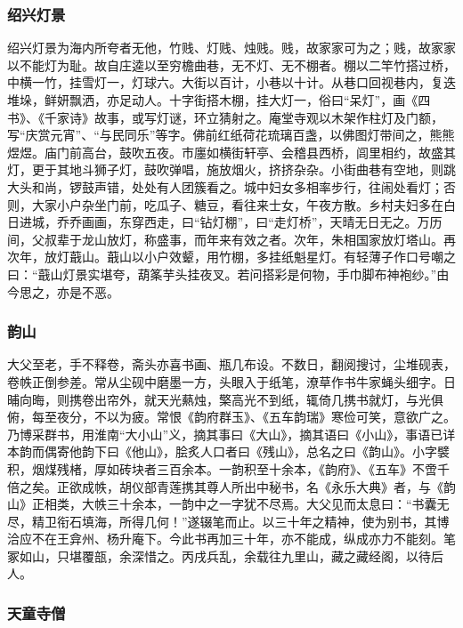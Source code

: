 \documentclass[]{article}
\begin{document}
\hypertarget{header-n449}{%
\subsubsection{绍兴灯景}\label{header-n449}}

绍兴灯景为海内所夸者无他，竹贱、灯贱、烛贱。贱，故家家可为之；贱，故家家以不能灯为耻。故自庄逵以至穷檐曲巷，无不灯、无不棚者。棚以二竿竹搭过桥，中横一竹，挂雪灯一，灯球六。大街以百计，小巷以十计。从巷口回视巷内，复迭堆垛，鲜妍飘洒，亦足动人。十字街搭木棚，挂大灯一，俗曰``呆灯''，画《四书》、《千家诗》故事，或写灯谜，环立猜射之。庵堂寺观以木架作柱灯及门额，写``庆赏元宵''、``与民同乐''等字。佛前红纸荷花琉璃百盏，以佛图灯带间之，熊熊煜煜。庙门前高台，鼓吹五夜。市廛如横街轩亭、会稽县西桥，闾里相约，故盛其灯，更于其地斗狮子灯，鼓吹弹唱，施放烟火，挤挤杂杂。小街曲巷有空地，则跳大头和尚，锣鼓声错，处处有人团簇看之。城中妇女多相率步行，往闹处看灯；否则，大家小户杂坐门前，吃瓜子、糖豆，看往来士女，午夜方散。乡村夫妇多在白日进城，乔乔画画，东穿西走，曰``钻灯棚''，曰``走灯桥''，天晴无日无之。万历间，父叔辈于龙山放灯，称盛事，而年来有效之者。次年，朱相国家放灯塔山。再次年，放灯蕺山。蕺山以小户效颦，用竹棚，多挂纸魁星灯。有轻薄子作口号嘲之曰：``蕺山灯景实堪夸，葫筿芋头挂夜叉。若问搭彩是何物，手巾脚布神袍纱。''由今思之，亦是不恶。

\hypertarget{header-n454}{%
\subsubsection{韵山}\label{header-n454}}

大父至老，手不释卷，斋头亦喜书画、瓶几布设。不数日，翻阅搜讨，尘堆砚表，卷帙正倒参差。常从尘砚中磨墨一方，头眼入于纸笔，潦草作书牛家蝇头细字。日晡向晦，则携卷出帘外，就天光爇烛，檠高光不到纸，辄倚几携书就灯，与光俱俯，每至夜分，不以为疲。常恨《韵府群玉》、《五车韵瑞》寒俭可笑，意欲广之。乃博采群书，用淮南``大小山''义，摘其事曰《大山》，摘其语曰《小山》，事语已详本韵而偶寄他韵下曰《他山》，脍炙人口者曰《残山》，总名之曰《韵山》。小字襞积，烟煤残楮，厚如砖块者三百余本。一韵积至十余本，《韵府》、《五车》不啻千倍之矣。正欲成帙，胡仪部青莲携其尊人所出中秘书，名《永乐大典》者，与《韵山》正相类，大帙三十余本，一韵中之一字犹不尽焉。大父见而太息曰：``书囊无尽，精卫衔石填海，所得几何！''遂辍笔而止。以三十年之精神，使为别书，其博洽应不在王弇州、杨升庵下。今此书再加三十年，亦不能成，纵成亦力不能刻。笔冢如山，只堪覆瓿，余深惜之。丙戌兵乱，余载往九里山，藏之藏经阁，以待后人。

\hypertarget{header-n459}{%
\subsubsection{天童寺僧}\label{header-n459}}
\end{document}
